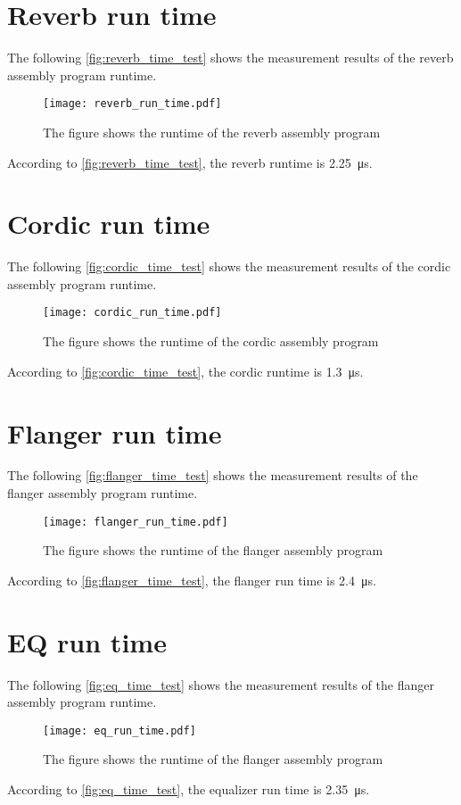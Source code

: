 \section*{Reverb run time}
The following \autoref{fig:reverb_time_test} shows the measurement results of the \gls{reverb} assembly program runtime.
\begin{figure}[htbp!]
	\centering
		\texttt{[image: reverb\_run\_time.pdf]}
		\caption{The figure shows the runtime of the \gls{reverb} assembly program}
		\label{fig:reverb_time_test}
\end{figure}

According to \autoref{fig:reverb_time_test}, the \gls{reverb} runtime is \SI{2.25}{\micro\second}.

\section*{Cordic run time}
The following \autoref{fig:cordic_time_test} shows the measurement results of the cordic assembly program runtime.
\begin{figure}[htbp!]
	\centering
		\texttt{[image: cordic\_run\_time.pdf]}
		\caption{The figure shows the runtime of the cordic assembly program}
		\label{fig:cordic_time_test}
\end{figure}

According to \autoref{fig:cordic_time_test}, the cordic runtime is \SI{1.3}{\micro\second}.

\section*{Flanger run time}
The following \autoref{fig:flanger_time_test} shows the measurement results of the flanger assembly program runtime.
\begin{figure}[htbp!]
	\centering
		\texttt{[image: flanger\_run\_time.pdf]}
		\caption{The figure shows the runtime of the flanger assembly program}
		\label{fig:flanger_time_test}
\end{figure}

According to \autoref{fig:flanger_time_test}, the flanger run time is \SI{2.4}{\micro\second}.

\section*{EQ run time}
The following \autoref{fig:eq_time_test} shows the measurement results of the flanger assembly program runtime.
\begin{figure}[htbp!]
	\centering
		\texttt{[image: eq\_run\_time.pdf]}
		\caption{The figure shows the runtime of the flanger assembly program}
		\label{fig:eq_time_test}
\end{figure}

According to \autoref{fig:eq_time_test}, the equalizer run time is \SI{2.35}{\micro\second}.